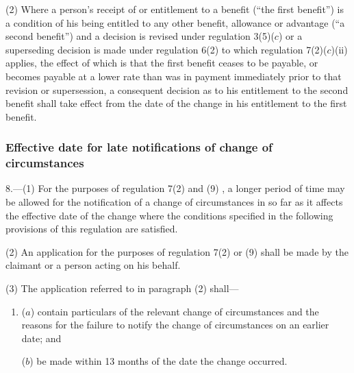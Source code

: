 \documentclass[12pt,a4paper]{article}
\begin{document}
(2) Where a person’s receipt of or entitlement to a benefit (“the first benefit”) is a condition of his being entitled to any other benefit, allowance or advantage (“a second benefit”) and a decision is revised under regulation 3(5)($c$) or a superseding decision is made under regulation 6(2) to which regulation 7(2)($c$)(ii) applies, the effect of which is that the first benefit ceases to be payable, or becomes payable at a lower rate than was in payment immediately prior to that revision or supersession, a consequent decision as to his entitlement to the second benefit shall take effect from the date of the change in his entitlement to the first benefit.


\subsubsection[8. Effective date for late notifications of change of circumstances]{Effective date for late notifications of change of circumstances}

8.—(1) For the purposes of regulation 7(2)
and (9)%
, a longer period of time may be allowed for the notification of a change of circumstances in so far as it affects the effective date of the change where the conditions specified in the following provisions of this regulation are satisfied.

(2) An application for the purposes of regulation 7(2) 
or (9)  %
shall be made by the claimant or a person acting on his behalf.

(3) The application referred to in paragraph (2) shall—
\begin{enumerate}\item[]
($a$) contain particulars of the relevant change of circumstances and the reasons for the failure to notify the change of circumstances on an earlier date; and

($b$) be made within 13 months of the date the change occurred.
\end{enumerate}
\end{document}
